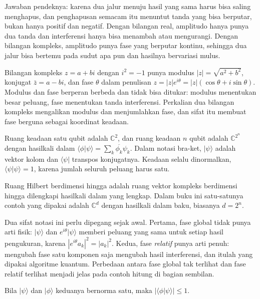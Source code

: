 Jawaban pendeknya: karena dua jalur menuju hasil yang sama harus bisa saling menghapus,
dan penghapusan semacam itu menuntut tanda yang bisa berputar, bukan hanya positif dan
negatif. Dengan bilangan real, amplitudo hanya punya dua tanda dan interferensi hanya
bisa menambah atau mengurangi. Dengan bilangan kompleks, amplitudo punya fase yang
berputar kontinu, sehingga dua jalur bisa bertemu pada sudut apa pun dan hasilnya
bervariasi mulus.

Bilangan kompleks $z=a+bi$ dengan $i^2=-1$ punya modulus $|z|=\sqrt{a^2+b^2}$, konjugat
$\bar z=a-bi$, dan fase $\theta$ dalam penulisan
$z=|z|e^{i\theta}=|z|(\cos\theta+i\sin\theta)$. Modulus dan fase berperan berbeda dan
tidak bisa ditukar: modulus menentukan besar peluang, fase menentukan tanda interferensi.
Perkalian dua bilangan kompleks mengalikan modulus dan menjumlahkan fase, dan sifat itu
membuat fase berguna sebagai koordinat keadaan.


Ruang keadaan satu qubit adalah $\mathbb{C}^2$, dan ruang keadaan $n$ qubit adalah
$\mathbb{C}^{2^n}$ dengan hasilkali dalam
$\langle\phi|\psi\rangle=\sum_k\overline{\phi_k}\psi_k$. Dalam notasi bra-ket,
$|\psi\rangle$ adalah vektor kolom dan $\langle\psi|$ transpos konjugatnya. Keadaan
selalu dinormalkan, $\langle\psi|\psi\rangle=1$, karena jumlah seluruh peluang
harus satu.

\begin{definisi}
Ruang Hilbert berdimensi hingga adalah ruang vektor kompleks berdimensi hingga
dilengkapi hasilkali dalam yang lengkap. Dalam buku ini satu-satunya contoh yang dipakai
adalah $\mathbb{C}^{d}$ dengan hasilkali dalam baku, biasanya $d=2^{n}$.
\end{definisi}

Dua sifat notasi ini perlu dipegang sejak awal. Pertama, fase global tidak punya arti
fisik: $|\psi\rangle$ dan $e^{i\theta}|\psi\rangle$ memberi peluang yang sama untuk
setiap hasil pengukuran, karena $|e^{i\theta}a_k|^2=|a_k|^2$. Kedua, fase
\emph{relatif} punya arti penuh: mengubah fase satu komponen saja mengubah hasil
interferensi, dan itulah yang dipakai algoritme kuantum. Perbedaan antara fase global tak terlihat dan
fase relatif terlihat menjadi jelas pada contoh hitung di bagian sembilan.

\begin{proposisi}
Bila $|\psi\rangle$ dan $|\phi\rangle$ keduanya bernorma satu, maka
$|\langle\phi|\psi\rangle|\le 1$.
\end{proposisi}

